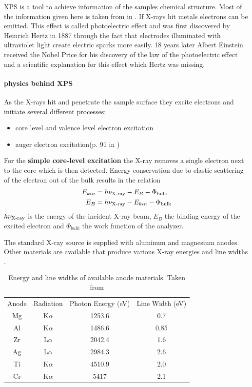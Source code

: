 \label{sec:XPS} XPS is a tool to achieve information of the samples chemical structure.
Most of the information given here is taken from \cite{Riviere_90} in \cite{briggs_auger_1990}.
If X-rays hit metals electrons can be emitted. This effect is called photoelectric effect and was first discovered by Heinrich Hertz in 1887 through the fact that electrodes illuminated with ultraviolet light create electric sparks more easily\cite{hertz_ueber_1887}. 18 years later Albert Einstein received the Nobel Price for his discovery of the law of the photoelectric effect\cite{_nobel_2015} and a scientific explanation for this effect which Hertz was missing.

\paragraph{physics behind XPS}
As the X-rays hit and penetrate the sample surface they excite electrons and initiate several different processes:
\begin{itemize}
 \item core level and valence level electron excitation
 \item auger electron excitation(p. 91 in \cite{Briggs_90})
\end{itemize}
\label{XPS}
For the \textbf{simple core-level excitation} the X-ray removes a single electron next to the core which is then detected. Energy conservation due to elastic scattering of the electron out of the bulk results in the relation 
\begin{align}
E_{kin} &= h\nu_{\textnormal{X-ray}}-E_{B}-\Phi_{\textnormal{bulk}} \\
E_B 	&=h\nu_{\textnormal{X-ray}}-E_{kin}-\Phi_{\textnormal{bulk}}
\end{align}
 $h\nu_{\textnormal{X-ray}}$ is the energy of the incident X-ray beam, $E_B$ the binding energy of the excited electron and $\Phi_{bulk}$ the work function of the analyzer. 
 
The standard X-ray source is supplied with aluminum and magnesium anodes. Other materials are available that produce various X-ray energies and line widths  \cite{_x-ray_2015}. 
\begin{table}\caption{Energy and line widths of available anode materials. Taken from }
 \centering
 \begin{tabular}{cccc}
Anode 	& 	Radiation 	& Photon Energy (eV) 	& Line Width (eV) \\
Mg	&	K$\alpha$ 	&	1253.6	&	0.7\\
Al	&	K$\alpha$ 	&	1486.6 	&	0.85\\
Zr 	&	L$\alpha$ 	&	2042.4 	&	1.6\\
Ag 	&	L$\alpha$ 	&	2984.3 	&	2.6\\
Ti 	&	K$\alpha$ 	&	4510.9 	&	2.0\\
Cr	&	K$\alpha$ 	&	5417 	&	2.1\\
 \end{tabular}
\end{table}

